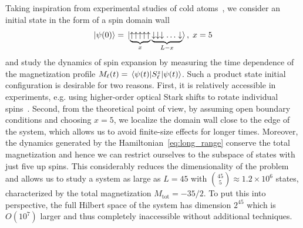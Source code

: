   Taking inspiration from experimental studies of cold atoms~\autocite{Joshi2022, Ronzheimer2013, Vidmar2013, Neyenhuis2017},
  we consider an initial state in the form of a spin domain wall
  \begin{equation}
    \ket{\psi(0)} = \ket*{\underbrace{\uparrow\uparrow\uparrow\uparrow\uparrow}_{x}
    \underbrace{\downarrow\downarrow\downarrow\ldots\downarrow}_{L-x}},\; x = 5
  \end{equation}
and study the dynamics of spin expansion by measuring the time dependence of the magnetization profile
\(M_{\ell}(t) = \matrixel{\psi(t)}{\Sz_{\ell}}{\psi(t)}\). Such a product state initial configuration is desirable for two reasons.
First, it is relatively accessible in experiments, e.g. using higher-order optical Stark shifts to rotate individual
spins~\autocite{Lee2016}. Second, from the theoretical point of view, by assuming open boundary conditions and
choosing \(x = 5\), we localize the domain wall close to the edge of the system, which allows us to avoid finite-size effects
for longer times. Moreover, the dynamics generated by the Hamiltonian~\eqref{eq:long_range} conserve the total magnetization
and hence we can restrict ourselves to the subspace of states with just five up spins. This considerably reduces
the dimensionality of the problem and allows us to study a system as large as \(L=45\) with
\(\binom{45}{5} \approx 1.2 \times 10^6\) states, characterized by the total magnetization \(M_{\mathrm{tot}} = -35/2\).
To put this into perspective, the full Hilbert space of the system
has dimension \(2^{45}\) which is \(O(10^7)\) larger and thus completely inaccessible without additional techniques.

